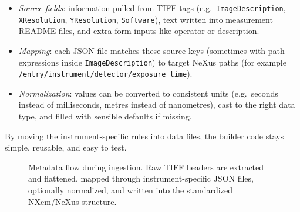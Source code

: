 \begin{itemize}
	\item \emph{Source fields}: information pulled from TIFF tags (e.g.\ \texttt{ImageDescription}, \texttt{XResolution}, \texttt{YResolution}, \texttt{Software}), 
	text written into measurement README files, and extra form inputs like operator or description.
	\item \emph{Mapping}: each JSON file matches these source keys (sometimes with path expressions inside \texttt{ImageDescription}) 
	to target NeXus paths (for example \texttt{/entry/instrument/detector/exposure\_time}).
	\item \emph{Normalization}: values can be converted to consistent units (e.g.\ seconds instead of milliseconds, metres instead of nanometres), 
	cast to the right data type, and filled with sensible defaults if missing.
\end{itemize}

By moving the instrument-specific rules into data files, the builder code stays simple, reusable, and easy to test.

\begin{figure}[h]
	\centering
	\caption{Metadata flow during ingestion. Raw TIFF headers are extracted and flattened, 
		mapped through instrument-specific JSON files, optionally normalized, 
		and written into the standardized NXem/NeXus structure.}
	\label{fig:metadata-flow}
\end{figure}

